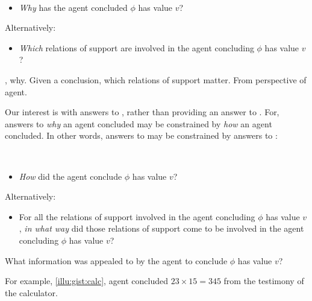 \begin{note}
  \begin{question}[\qWhy{}?]
    \label{q:why}
    \mbox{ }
    \vspace{-\baselineskip}
    \begin{itemize}
    \item
      \emph{Why} has the agent concluded \(\phi\) has value \(v\)?
    \end{itemize}

    Alternatively:

    \begin{itemize}
    \item
      \emph{Which} relations of support are involved in the agent concluding \(\phi\) has value \(v\)?
    \end{itemize}
    \vspace{-\baselineskip}
    \vspace{-\baselineskip}
  \end{question}

  , why.
  Given a conclusion, which relations of support matter.
  From perspective of agent.
\end{note}

\begin{note}
  Our interest is with answers to \qWhy{}, rather than providing an answer to \qWhy{}.
  For, answers to \emph{why} an agent concluded may be constrained by \emph{how} an agent concluded.
  In other words, answers to \qWhy{} may be constrained by answers to \qHow{}:

  \begin{question}[\qHow{}?]
    \label{q:how}
    \mbox{ }
    \vspace{-\baselineskip}
    \begin{itemize}
    \item
      \emph{How} did the agent conclude \(\phi\) has value \(v\)?
    \end{itemize}

    Alternatively:

    \begin{itemize}
    \item
      For all the relations of support involved in the agent concluding \(\phi\) has value \(v\), \emph{in what way} did those relations of support come to be involved in the agent concluding \(\phi\) has value \(v\)?
    \end{itemize}
    \vspace{-\baselineskip}
    \vspace{-\baselineskip}
  \end{question}

  What information was appealed to by the agent to conclude \(\phi\) has value \(v\)?

  For example, \autoref{illu:gist:calc}, agent concluded \(23 \times 15 = 345\) from the testimony of the calculator.
\end{note}

